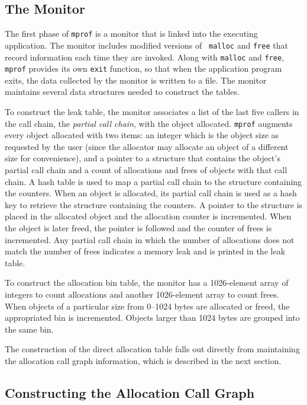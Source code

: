 \subsection{The Monitor} 

The first phase of {\tt mprof} is a monitor that is linked into the
executing application.  The monitor includes modified versions of {\tt
malloc} and {\tt free} that record information each time they are
invoked.  Along with {\tt malloc} and {\tt free}, {\tt mprof} provides
its own {\tt exit} function, so that when the application program
exits, the data collected by the monitor is written to a file.  The
monitor maintains several data structures needed to construct the
tables.

To construct the leak table, the monitor associates a list of the last
five callers in the call chain, the {\em partial call chain\/}, with
the object allocated.  {\tt mprof} augments every object allocated
with two items: an integer which is the object size as requested by
the user (since the allocator may allocate an object of a different
size for convenience), and a pointer to a structure that contains the
object's partial call chain and a count of allocations and frees of
objects with that call chain.  A hash table is used to map a partial
call chain to the structure containing the counters.  When an object
is allocated, its partial call chain is used as a hash key to retrieve
the structure containing the counters.  A pointer to the structure is
placed in the allocated object and the allocation counter is
incremented.  When the object is later freed, the pointer is followed
and the counter of frees is incremented.  Any partial call chain in
which the number of allocations does not match the number of frees
indicates a memory leak and is printed in the leak table.

To construct the allocation bin table, the monitor has a 1026-element
array of integers to count allocations and another 1026-element array
to count frees.  When objects of a particular size from 0--1024 bytes
are allocated or freed, the appropriated bin is incremented.  Objects
larger than 1024 bytes are grouped into the same bin.

The construction of the direct allocation table falls out directly
from maintaining the allocation call graph information, which is
described in the next section.

\subsection{Constructing the Allocation Call Graph}

